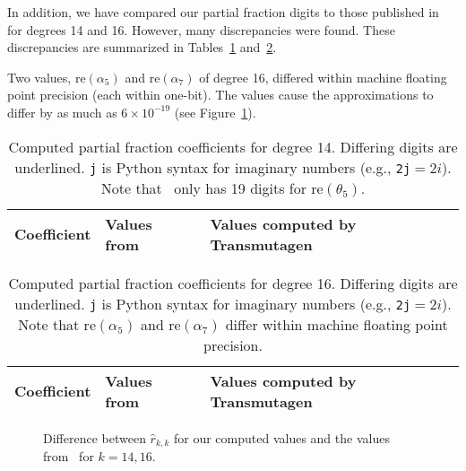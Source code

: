 
In addition, we have compared our partial fraction digits to those published
in~\cite{pusa2012correction} for degrees 14 and 16. However, many
discrepancies were found. These discrepancies are summarized in
Tables~\ref{table:pusa-degree-14} and~\ref{table:pusa-degree-16}.

Two values, $\mathrm{re}(\alpha_5)$ and $\mathrm{re}(\alpha_7)$ of degree 16,
differed within machine floating point precision (each within one-bit). The
values cause the approximations to differ by as much as $6\times10^{-19}$ (see
Figure~\ref{fig:pusa-differences}).

\setul{}{1pt}

\begin{table}[h!]
\centering
\begin{tabular}{ r b{1.8in} b{1.8in} }
Coefficient & Values from~\cite{pusa2012correction} & Values computed by Transmutagen \\
\midrule

\bottomrule
\end{tabular}
\caption{Computed partial fraction coefficients for degree 14. Differing
  digits are underlined. \texttt{j} is Python syntax for imaginary numbers
  (e.g., \texttt{2j}$=2i$). Note that~ only has 19
  digits for $\mathrm{re}(\theta_5)$.}
\label{table:pusa-degree-14}
\end{table}

\begin{table}[h!]
\centering
\begin{tabular}{ r b{1.8in} b{1.8in} }
Coefficient & Values from~\cite{pusa2012correction} & Values computed by Transmutagen \\
\midrule

\bottomrule
\end{tabular}
\caption{Computed partial fraction coefficients for degree 16. Differing
  digits are underlined. \texttt{j} is Python syntax for imaginary numbers
  (e.g., \texttt{2j}$=2i$). Note that $\mathrm{re}(\alpha_5)$ and
  $\mathrm{re}(\alpha_7)$ differ within machine floating point
  precision.}
\label{table:pusa-degree-16}
\end{table}

\begin{figure}[!ht]
\centering
\resizebox{0.9\textwidth}{!}{}
\caption{Difference between $\hat{r}_{k,k}$ for our computed values and the
  values from~ for $k=14,16$.}
\label{fig:pusa-differences}
\end{figure}

